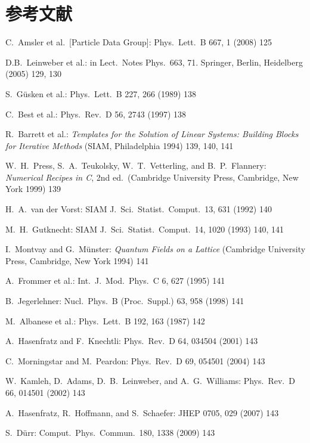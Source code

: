 \section*{参考文献}

\begin{enumerate}[label={[\arabic*]}]
  \item C.~Amsler et al.\ [Particle Data Group]: Phys.\ Lett.\ B 667, 1 (2008) 125
  \item D.B.~Leinweber et al.: in Lect.\ Notes Phys.\ 663, 71. Springer, Berlin,
        Heidelberg (2005) 129, 130
  \item S.~G\"usken et al.: Phys.\ Lett.\ B 227, 266 (1989) 138
  \item C.~Best et al.: Phys.\ Rev.\ D 56, 2743 (1997) 138
  \item R.~Barrett et al.: \emph{Templates for the Solution of Linear Systems:
        Building Blocks for Iterative Methods} (SIAM, Philadelphia 1994) 139,
        140, 141
  \item W.~H.~Press, S.~A.~Teukolsky, W.~T.~Vetterling, and B.~P.~Flannery:
        \emph{Numerical Recipes in C}, 2nd ed.\ (Cambridge University Press,
        Cambridge, New York 1999) 139
  \item H.~A.~van der Vorst: SIAM J.\ Sci.\ Statist.\ Comput.\ 13, 631 (1992)
        140
  \item M.~H.~Gutknecht: SIAM J.\ Sci.\ Statist.\ Comput.\ 14, 1020 (1993) 140,
        141
  \item I.~Montvay and G.~M\"unster: \emph{Quantum Fields on a Lattice}
        (Cambridge University Press, Cambridge, New York 1994) 141
  \item A.~Frommer et al.: Int.\ J.\ Mod.\ Phys.\ C 6, 627 (1995) 141
  \item B.~Jegerlehner: Nucl.\ Phys.\ B (Proc.\ Suppl.) 63, 958 (1998) 141
  \item M.~Albanese et al.: Phys.\ Lett.\ B 192, 163 (1987) 142
  \item A.~Hasenfratz and F.~Knechtli: Phys.\ Rev.\ D 64, 034504 (2001) 143
  \item C.~Morningstar and M.~Peardon: Phys.\ Rev.\ D 69, 054501 (2004) 143
  \item W.~Kamleh, D.~Adams, D.~B.~Leinweber, and A.~G.~Williams: Phys.\ Rev.\
        D 66, 014501 (2002) 143
  \item A.~Hasenfratz, R.~Hoffmann, and S.~Schaefer: JHEP 0705, 029 (2007) 143
  \item S.~D\"urr: Comput.\ Phys.\ Commun.\ 180, 1338 (2009) 143

\end{enumerate}
